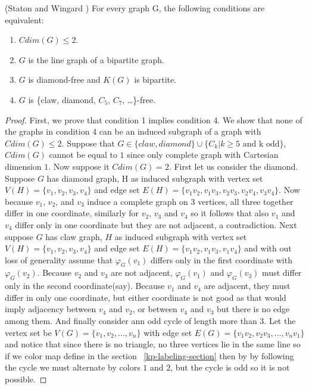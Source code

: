 \documentclass[12pt,a4paper,titlepage,openany]{report}
\begin{document}
\begin{theorem}(Staton and Wingard \cite{Staton})
For every graph G, the following conditions are equivalent:
\begin{enumerate}
\item $Cdim(G)\leq 2$.
\item $G$ is the line graph of a bipartite graph.
\item $G$ is diamond-free and $K(G)$ is bipartite.
\item $G$ is \{claw, diamond, $C_5$, $C_7$, \ldots\}-free.
\end{enumerate}
\end{theorem}

\begin{proof}
First, we prove that condition 1 implies condition 4. We show that none of the graphs in condition 4 can be an induced subgraph of a graph with $Cdim(G)\leq 2$. Suppose that $G\in \{ claw, diamond\} \cup \{C_k|k\geq 5 \text{ and k odd}\}$, $Cdim(G)$ cannot be equal to $1$ since only complete graph with Cartesian dimension $1$. Now suppose it $Cdim(G)=2$.
\newline First let us consider the diamond. Suppose $G$ has diamond graph, H as induced subgraph with vertex set $V(H)=\{v_1,v_2,v_3,v_4\}$ and edge set $E(H)=\{v_1v_2,v_1v_3,v_2v_3,v_2v_4,v_3v_4\}$. Now because $v_1$, $v_2$, and $v_3$ induce a complete graph on $3$ vertices, all three together differ in one coordinate, similarly for $v_2$, $v_3$ and $v_4$ so it follows that also $v_1$ and $v_4$ differ only in one coordinate but they are not adjacent, a contradiction.
\newline Next suppose $G$ has claw graph, $H$ as induced subgraph with vertex set $V(H)=\{v_1,v_2,v_3,v_4\}$ and edge set $E(H)=\{v_1v_2,v_1v_3,v_1v_4\}$ and with out loss of generality assume that $\varphi_G(v_1)$ differs only in the first coordinate with $\varphi_G(v_2)$. Because $v_2$ and $v_3$ are not adjacent, $\varphi_G(v_1)$ and $\varphi_G(v_3)$ must differ only in the second coordinate(say). Because $v_1$ and $v_4$ are adjacent, they must differ in only one coordinate, but either coordinate is not good as that would  imply adjacency between $v_4$ and $v_2$, or between $v_4$ and $v_3$ but there is no edge among them.
\newline And finally consider ann odd cycle of length more than 3. Let the vertex set be $V(G)=\{v_1,v_2,...,v_n\}$ with edge set $E(G)=\{v_1v_2,v_2v_3,\ldots ,v_nv_1\}$ and notice that since there is no triangle, no three vertices lie in the same line so if we color map define in the section ~\ref{kp-labeling-section} then by by following the cycle we must alternate by colors $1$ and $2$, but the cycle is odd so it is not possible.\newline

\end{proof}
\end{document}

